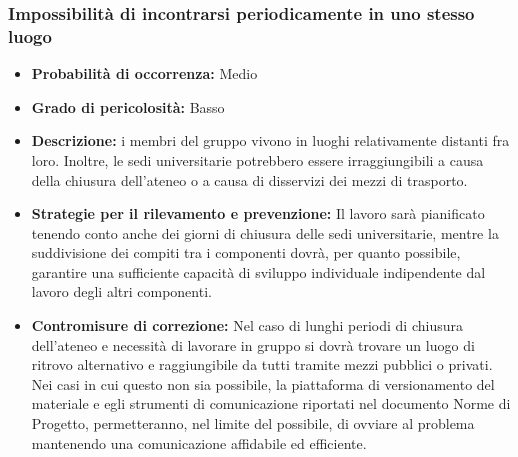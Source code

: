 \subsubsection{Impossibilità di incontrarsi periodicamente in uno stesso luogo}
\hypertarget{subsubsect:incontri}{}
\begin{itemize}
\item \textbf{Probabilità di occorrenza:} Medio
\item \textbf{Grado di pericolosità:} Basso
\item \textbf{Descrizione:} i membri del gruppo vivono in luoghi relativamente distanti fra loro. Inoltre, le sedi universitarie potrebbero essere irraggiungibili a causa della chiusura dell'ateneo o a causa di disservizi dei mezzi di trasporto.

\item \textbf{Strategie per il rilevamento e prevenzione:}  Il lavoro sarà pianificato tenendo conto anche dei giorni di chiusura delle sedi universitarie, mentre la suddivisione dei compiti tra i componenti dovrà, per quanto possibile, garantire una sufficiente capacità di sviluppo individuale indipendente dal lavoro degli altri componenti. 

\item \textbf{Contromisure di correzione:} Nel caso di lunghi periodi di chiusura dell'ateneo e necessità di lavorare in gruppo si dovrà trovare un luogo di ritrovo alternativo e raggiungibile da tutti tramite mezzi pubblici o privati. Nei casi in cui questo non sia possibile, la piattaforma di versionamento del materiale e egli strumenti di comunicazione riportati nel documento Norme di Progetto, permetteranno, nel limite del possibile, di ovviare al problema mantenendo una comunicazione affidabile ed efficiente.
\end{itemize}

